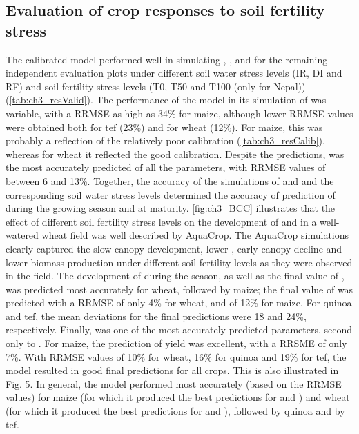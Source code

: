 \subsection{Evaluation of crop responses to soil fertility stress}
The calibrated model performed well in simulating \SWCr, \CC, \B and \Y for the remaining independent evaluation plots under different soil water stress levels (IR, DI and RF) and soil fertility stress levels (T0, T50 and T100 (only for Nepal)) (\autoref{tab:ch3_resValid}). The performance of the model in its simulation of \CC was variable, with a RRMSE as high as 34\% for maize, although lower RRMSE values were obtained both for tef (23\%) and for wheat (12\%). For maize, this was probably a reflection of the relatively poor \CC calibration (\autoref{tab:ch3_resCalib}), whereas for wheat it reflected the good \CC calibration. Despite the \CC predictions, \SWCr was the most accurately predicted of all the parameters, with RRMSE values of between 6 and 13\%. Together, the accuracy of the simulations of \CC and \SWCr and the corresponding soil water stress levels determined the accuracy of prediction of \B during the growing season and at maturity. \autoref{fig:ch3_BCC} illustrates that the effect of different soil fertility stress levels on the development of \CC and \B in a well-watered wheat field was well described by AquaCrop. The AquaCrop simulations clearly captured the slow canopy development, lower \CCx, early canopy decline and lower biomass production under different soil fertility levels as they were observed in the field. The development of \B during the season, as well as the final value of \B, was predicted most accurately for wheat, followed by maize; the final value of \B was predicted with a RRMSE of only 4\% for wheat, and of 12\% for maize. For quinoa and tef, the mean deviations for the final \B predictions were 18 and 24\%, respectively. Finally, \Y was one of the most accurately predicted parameters, second only to \SWCr. For maize, the prediction of yield was excellent, with a RRSME of only 7\%. With RRMSE values of 10\% for wheat, 16\% for quinoa and 19\% for tef, the model resulted in good final \Y predictions for all crops. This is also illustrated in Fig. 5. In general, the model performed most accurately (based on the RRMSE values) for maize (for which it produced the best predictions for \Y and \SWCr) and wheat (for which it produced the best predictions for \B and \CC), followed by quinoa and by tef. 


